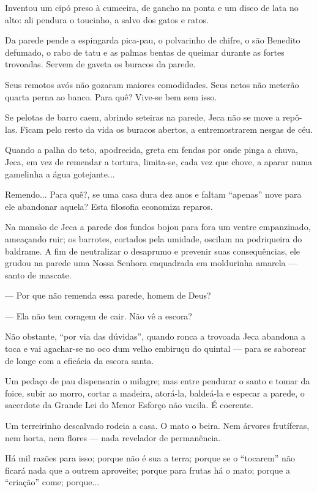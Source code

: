 Inventou um cipó preso à cumeeira, de gancho na ponta e um disco de lata
no alto: ali pendura o toucinho, a salvo dos gatos e ratos.

Da parede pende a espingarda pica-pau, o polvarinho de chifre, o são
Benedito defumado, o rabo de tatu e as palmas bentas de queimar durante
as fortes trovoadas. Servem de gaveta os buracos da parede.

Seus remotos avós não gozaram maiores comodidades. Seus netos não
meterão quarta perna ao banco. Para quê? Vive-se bem sem isso.

Se pelotas de barro caem, abrindo seteiras na parede, Jeca não se move a
repô-las. Ficam pelo resto da vida os buracos abertos, a entremostrarem
nesgas de céu.

Quando a palha do teto, apodrecida, greta em fendas por onde pinga a
chuva, Jeca, em vez de remendar a tortura, limita-se, cada vez que
chove, a aparar numa gamelinha a água gotejante...

Remendo... Para quê?, se uma casa dura dez anos e faltam ``apenas'' nove
para ele abandonar aquela? Esta filosofia economiza reparos.

Na mansão de Jeca a parede dos fundos bojou para fora um ventre
empanzinado, ameaçando ruir; os barrotes, cortados pela umidade, oscilam
na podriqueira do baldrame. A fim de neutralizar o desaprumo e prevenir
suas consequências, ele grudou na parede uma Nossa Senhora enquadrada em
moldurinha amarela --- santo de mascate.

--- Por que não remenda essa parede, homem de Deus?

--- Ela não tem coragem de cair. Não vê a escora?

Não obstante, ``por via das dúvidas'', quando ronca a trovoada Jeca
abandona a toca e vai agachar-se no oco dum velho embiruçu do quintal
--- para se saborear de longe com a eficácia da escora santa.

Um pedaço de pau dispensaria o milagre; mas entre pendurar o santo e
tomar da foice, subir ao morro, cortar a madeira, atorá-la, baldeá-la e
especar a parede, o sacerdote da Grande Lei do Menor Esforço não vacila.
É coerente.

Um terreirinho descalvado rodeia a casa. O mato o beira. Nem árvores
frutíferas, nem horta, nem flores --- nada revelador de permanência.

Há mil razões para isso; porque não é sua a terra; porque se o
``tocarem'' não ficará nada que a outrem aproveite; porque para frutas
há o mato; porque a ``criação'' come; porque...

